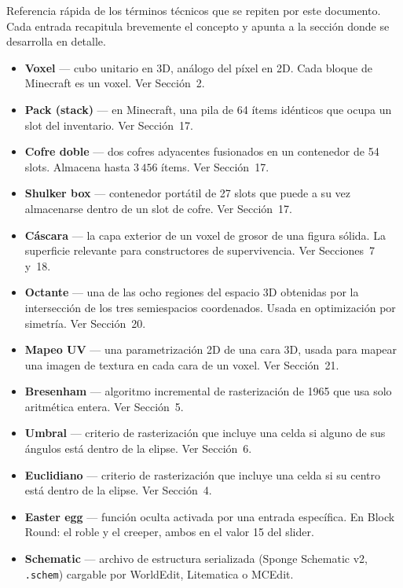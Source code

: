 \documentclass[12pt,a4paper]{scrartcl}
\newcommand{\code}[1]{\texttt{\small #1}}
\begin{document}
Referencia rápida de los términos técnicos que se repiten por este documento. Cada entrada recapitula brevemente el concepto y apunta a la sección donde se desarrolla en detalle.

\begin{itemize}[leftmargin=1.4em,itemsep=0.18em,topsep=0.3em]
  \item \textbf{Voxel} --- cubo unitario en 3D, análogo del píxel en 2D. Cada bloque de Minecraft es un voxel. Ver Sección~2.
  \item \textbf{Pack (stack)} --- en Minecraft, una pila de 64 ítems idénticos que ocupa un slot del inventario. Ver Sección~17.
  \item \textbf{Cofre doble} --- dos cofres adyacentes fusionados en un contenedor de 54 slots. Almacena hasta $3\,456$ ítems. Ver Sección~17.
  \item \textbf{Shulker box} --- contenedor portátil de 27 slots que puede a su vez almacenarse dentro de un slot de cofre. Ver Sección~17.
  \item \textbf{Cáscara} --- la capa exterior de un voxel de grosor de una figura sólida. La superficie relevante para constructores de supervivencia. Ver Secciones~7 y~18.
  \item \textbf{Octante} --- una de las ocho regiones del espacio 3D obtenidas por la intersección de los tres semiespacios coordenados. Usada en optimización por simetría. Ver Sección~20.
  \item \textbf{Mapeo UV} --- una parametrización 2D de una cara 3D, usada para mapear una imagen de textura en cada cara de un voxel. Ver Sección~21.
  \item \textbf{Bresenham} --- algoritmo incremental de rasterización de 1965 que usa solo aritmética entera. Ver Sección~5.
  \item \textbf{Umbral} --- criterio de rasterización que incluye una celda si alguno de sus ángulos está dentro de la elipse. Ver Sección~6.
  \item \textbf{Euclidiano} --- criterio de rasterización que incluye una celda si su centro está dentro de la elipse. Ver Sección~4.
  \item \textbf{Easter egg} --- función oculta activada por una entrada específica. En Block Round: el roble y el creeper, ambos en el valor 15 del slider.
  \item \textbf{Schematic} --- archivo de estructura serializada (Sponge Schematic v2, \code{.schem}) cargable por WorldEdit, Litematica o MCEdit.
\end{itemize}
\end{document}
